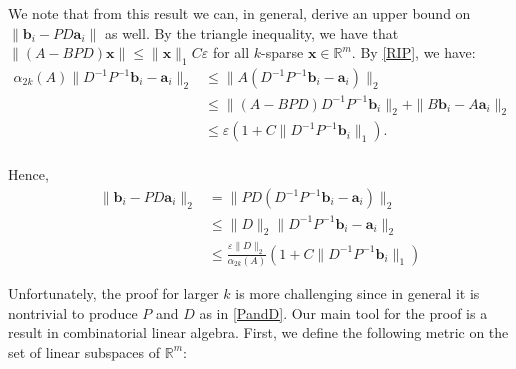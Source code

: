 \documentclass[journal, onecolumn]{IEEEtran}
\begin{document}
We note that from this result we can, in general, derive an upper bound on $\|\mathbf{b}_i - PD\mathbf{a}_i\|$ as well. By the triangle inequality, we have that $\|(A-BPD)\mathbf{x}\| \leq \|\mathbf{x}\|_1C\varepsilon$ for all $k$-sparse $\mathbf{x} \in \mathbb{R}^m$. By \eqref{RIP}, we have:
\begin{align*}
\alpha_{2k}(A) \|D^{-1}P^{-1}\mathbf{b}_i - \mathbf{a}_i\|_2 
&\leq \|A(D^{-1}P^{-1}\mathbf{b}_i - \mathbf{a}_i)\|_2 \\
&\leq \|(A - BPD)D^{-1}P^{-1}\mathbf{b}_i\|_2 + \|B\mathbf{b}_i - A\mathbf{a}_i\|_2 \\
&\leq \varepsilon (1 + C\|D^{-1}P^{-1}\mathbf{b}_i\|_1). \\
\end{align*}

Hence, 
\begin{align*}
\|\mathbf{b}_i - PD\mathbf{a}_i\|_2 &=  \|PD(D^{-1}P^{-1}\mathbf{b}_i - \mathbf{a}_i)\|_2 \\
&\leq \|D\|_2 \|D^{-1}P^{-1}\mathbf{b}_i - \mathbf{a}_i\|_2 \\
&\leq \frac{\varepsilon \|D\|_2}{\alpha_{2k}(A)}\left( 1 + C\|D^{-1}P^{-1}\mathbf{b}_i\|_1 \right)
\end{align*}


Unfortunately, the proof for larger $k$ is more challenging since in general it is nontrivial to produce $P$ and $D$ as in \eqref{PandD}. Our main tool for the proof is a result in combinatorial linear algebra. First, we define the following metric on the set of linear subspaces of $\mathbb{R}^m$:
\end{document}
